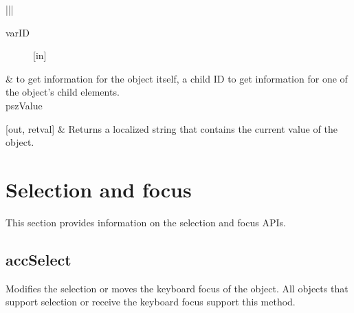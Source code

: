 \documentclass[letterpaper,12pt,english,openany,oneside]{sphinxmanual}
\begin{document}
\begin{sphinxVerbatim}[commandchars=\\\{\}]
     
\end{sphinxVerbatim}



\begin{savenotes}\sphinxattablestart
\centering
{}\label{\detokenize{MSAA_PDF:section-11}}\nobreak
\begin{tabular}[t]{|*{2}{|}}
\hline
\begin{description}
\item[{varID}] \leavevmode
{[}in{]}

\end{description}
&
 to get information for the object itself, a child ID to get information for one of the object’s child elements.
\\
\hline
pszValue

{[}out, retval{]}
&
Returns a localized string that contains the current value of the object.
\\
\hline
\end{tabular}
\par
\sphinxattableend\end{savenotes}


\begin{sphinxVerbatim}[commandchars=\\\{\}]
\end{sphinxVerbatim}




\section{Selection and focus}
\label{\detokenize{MSAA_PDF:selection-and-focus}}
This section provides information on the selection and focus APIs.


\subsection{accSelect}
\label{\detokenize{MSAA_PDF:accselect}}
Modifies the selection or moves the keyboard focus of the object. All objects that support selection or receive the keyboard focus support this method.
\end{document}
